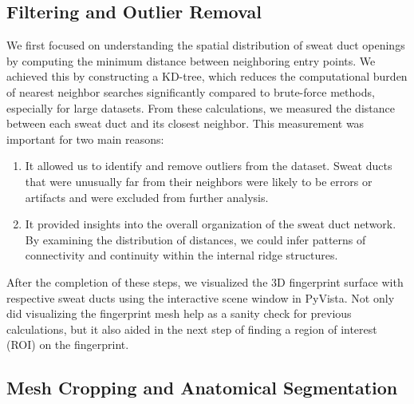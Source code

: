 \subsection{Filtering and Outlier Removal}

We first focused on understanding the spatial distribution of sweat duct openings by computing the minimum distance between neighboring entry points. We achieved this by constructing a KD-tree, which reduces the computational burden of nearest neighbor searches significantly compared to brute-force methods, especially for large datasets. From these calculations, we measured the distance between each sweat duct and its closest neighbor. This measurement was important for two main reasons:

\begin{enumerate}
    \item It allowed us to identify and remove outliers from the dataset. Sweat ducts that were unusually far from their neighbors were likely to be errors or artifacts and were excluded from further analysis.
    \item It provided insights into the overall organization of the sweat duct network. By examining the distribution of distances, we could infer patterns of connectivity and continuity within the internal ridge structures.
\end{enumerate}
After the completion of these steps, we visualized the 3D fingerprint surface with respective sweat ducts using the interactive scene window in PyVista. Not only did visualizing the fingerprint mesh help as a sanity check for previous calculations, but it also aided in the next step of finding a region of interest (ROI) on the fingerprint.
\subsection{Mesh Cropping and Anatomical Segmentation}

